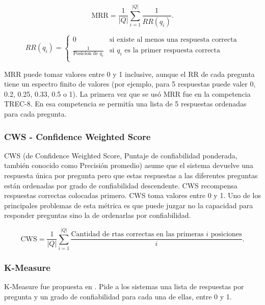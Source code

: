 \begin{equation}\label{eq:mrr}
 \text{MRR} = \frac{1}{|Q|} \sum_{i=1}^{|Q|} \frac{1}{RR(q_i)}. \!
\end{equation}

\begin{equation*}
    RR(q_i) = \begin{cases}
               0     & \text{si existe al menos una respuesta correcta}\\
               \frac{1}{\text{Posicion de }q_i} & \text{si }q_i\text{ es la primer respuesta correcta}\\
           \end{cases}
\end{equation*}

MRR puede tomar valores entre 0 y 1 inclusive, aunque el RR de cada pregunta tiene un espectro finito de valores (por ejemplo, para 5 respuestas puede valer 0, 0.2, 0.25, 0.33, 0.5 o 1). La primera vez que se usó MRR fue en la competencia TREC-8. En esa competencia se permitía una lista de 5 respuestas ordenadas para cada pregunta.  


\subsubsection*{CWS - Confidence Weighted Score}
CWS (de Confidence Weighted Score, Puntaje de confiabilidad ponderada, también conocido como Precisión promedio) asume que el sistema devuelve una respuesta única por pregunta pero que estas respuestas a las diferentes preguntas están ordenadas por grado de confiabilidad descendente. 
CWS recompensa respuestas correctas colocadas primero. CWS toma valores entre 0 y 1.  Uno de los principales problemas de esta métrica es que puede juzgar no la capacidad para responder preguntas sino la de ordenarlas por confiabilidad.

\begin{equation}\label{eq:cws}
 \text{CWS} = \frac{1}{|Q|} \sum_{i=1}^{|Q|} \frac{\text{Cantidad de rtas correctas en las primeras $i$ posiciones}}{i}. \!
\end{equation}

 
\subsubsection*{K-Measure}
K-Measure fue propuesta en \cite{CLEF04}. Pide a los sistemas una lista de respuestas por pregunta y un grado de confiabilidad para cada una de ellas, entre 0 y 1. 

